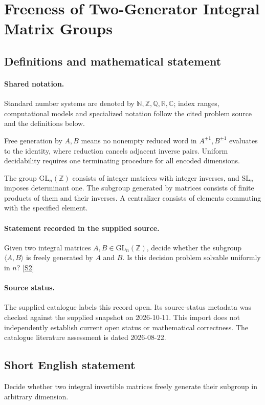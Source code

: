 \documentclass[11pt]{article}
\newcommand{\sref}[2]{\hyperlink{source:#1:#2}{[S#2]}}
\begin{document}
\section{Freeness of Two-Generator Integral Matrix Groups}\label{statement}

\subsection{Definitions and mathematical statement}

\paragraph{Shared notation.}Standard number systems are denoted by $\mathbb N,\mathbb Z,\mathbb Q,\mathbb R,\mathbb C$; index ranges, computational models and specialized notation follow the cited problem source and the definitions below.


Free generation by $A,B$ means no nonempty reduced word in $A^{\pm1},B^{\pm1}$ evaluates to the identity, where reduction cancels adjacent inverse pairs. Uniform decidability requires one terminating procedure for all encoded dimensions.

The group $\mathrm{GL}_n(\mathbb Z)$ consists of integer matrices with integer inverses, and $\mathrm{SL}_n$ imposes determinant one. The subgroup generated by matrices consists of finite products of them and their inverses. A centralizer consists of elements commuting with the specified element.
\paragraph{Statement recorded in the supplied source.}
Given two integral matrices $A,B\in\mathrm{GL}_n(\mathbb{Z})$, decide whether the subgroup $\langle A,B\rangle$ is freely generated by $A$ and $B$. Is this decision problem solvable uniformly in $n$? \sref{statement}{2}
\paragraph{Source status.}
The supplied catalogue labels this record open. Its source-status metadata was checked against the supplied snapshot on 2026-10-11. This import does not independently establish current open status or mathematical correctness. The catalogue literature assessment is dated 2026-08-22.
\subsection{Short English statement}
Decide whether two integral invertible matrices freely generate their subgroup in arbitrary dimension.
\end{document}
